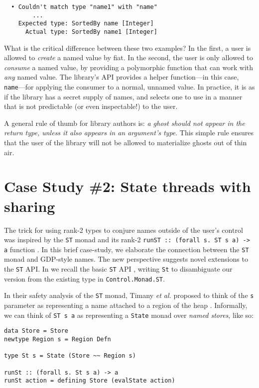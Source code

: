 \documentclass[format=sigplan, review=false, screen=true]{acmart}
\begin{document}
\begin{lstlisting}
  • Couldn't match type "name1" with "name"
        ...
    Expected type: SortedBy name [Integer]
      Actual type: SortedBy name1 [Integer]
\end{lstlisting}
\noindent
What is the critical difference between these two examples? In the first, a user is
allowed to \emph{create} a named value by fiat. In the second, the user is only allowed to \emph{consume} a named value, by
providing a polymorphic function that can work with \emph{any} named value. The library's API provides
a helper function---in this case, \texttt{name}---for applying the consumer to a normal, unnamed value.
In practice, it is as if the
library has a secret supply of names, and selects one to use in a manner that is not
predictable (or even inspectable!) to the user.

A general rule of thumb for library authors is:
\emph{a ghost should not appear in the return type,  unless it also appears in an argument's type}. This simple rule ensures that
the user of the library will not be allowed to materialize ghosts out of thin air.

\section{Case Study \#2: State threads with sharing}
The trick for using rank-2 types to conjure names outside of the user's control was
inspired by the \texttt{ST} monad and its rank-2 \texttt{runST :: (forall s. ST s a) -> a}
function \cite{launchbury1994lazy}. In this brief case-study, we elaborate the connection
between the \texttt{ST} monad and GDP-style names. The new perspective suggests novel
extensions to the \texttt{ST} API.
In  we recall the basic \texttt{ST} API \cite{launchbury1994lazy}, writing \texttt{St} to
disambiguate our version from the existing type in \texttt{Control.Monad.ST}.

In their safety analysis of the \texttt{ST} monad, Timany \textit{et al.} proposed to think of the \texttt{s} parameter as
representing a name attached to a region of the heap \cite{timany2017logical}.
Informally, we can think of \texttt{ST s a} as representing a \texttt{State} monad over
\emph{named stores}, like so:
\begin{verbatim}
data Store = Store
newtype Region s = Region Defn

type St s = State (Store ~~ Region s)

runSt :: (forall s. St s a) -> a
runSt action = defining Store (evalState action)
\end{verbatim}
\end{document}
